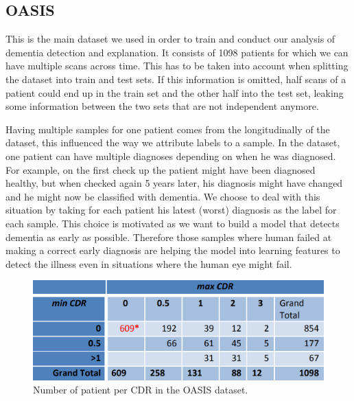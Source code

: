 \subsection{OASIS}
\label{sec:OASIS}
This is the main dataset we used in order to train and conduct our analysis of dementia detection and explanation. It consists of 1098 patients for which we can have multiple scans across time. This has to be taken into account when splitting the dataset into train and test sets. If this information is omitted, half scans of a patient could end up in the train set and the other half into the test set, leaking some information between the two sets that are not independent anymore.


Having multiple samples for one patient comes from the longitudinally of the dataset, this influenced the way we attribute labels to a sample. In the dataset, one patient can have multiple diagnoses depending on when he was diagnosed. For example, on the first check up the patient might have been diagnosed healthy, but when checked again 5 years later, his diagnosis might have changed and he might now be classified with dementia. We choose to deal with this situation by taking for each patient his latest (worst) diagnosis as the label for each sample. This choice is motivated as we want to build a model that detects dementia as early as possible. Therefore those samples where human failed at making a correct early diagnosis are helping the model into learning features to detect the illness even in situations where the human eye might fail.
\begin{figure}
 \centering
 \includegraphics[width=.9\linewidth]{figures/dataset/OASIS_CDR_table.png}
 \captionsetup{width=.9\linewidth}
 \caption[OASIS_CDR_table]{Number of patient per CDR in the OASIS dataset\footnotemark{}.}
 \label{fig:OASIS_CDR_table}
\end{figure}
